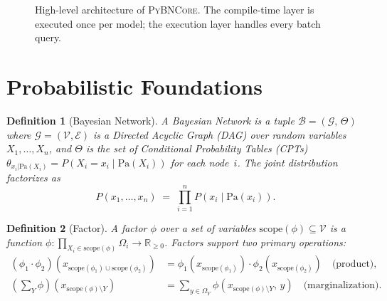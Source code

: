 \documentclass[11pt, letterpaper]{article}
\newcommand{\bncore}{\textsc{PyBNCore}}
\newcommand{\R}{\mathbb{R}}
\newcommand{\Pa}{\mathrm{Pa}}
\newcommand{\scope}{\mathrm{scope}}
\newcommand{\marg}[2]{\sum_{#1}{#2}}
\theoremstyle{definitionstyle}
\newtheorem{definition}{Definition}
\begin{document}
\begin{figure}[ht]
\caption{High-level architecture of \bncore{}. The compile-time layer is
executed once per model; the execution layer handles every batch query.}
\label{fig:architecture}
\end{figure}


\section{Probabilistic Foundations}
\label{sec:foundations}

\begin{definition}[Bayesian Network]
A Bayesian Network is a tuple $\mathcal{B} = (\mathcal{G},\, \Theta)$
where $\mathcal{G} = (\mathcal{V}, \mathcal{E})$ is a Directed Acyclic
Graph (DAG) over random variables $X_1, \ldots, X_n$, and $\Theta$
is the set of Conditional Probability Tables (CPTs)
$\theta_{x_i|\Pa(X_i)}=P(X_i{=}x_i\mid \Pa(X_i))$ for each node~$i$.
The joint distribution factorizes as
\[
  P(x_1,\ldots,x_n) \;=\; \prod_{i=1}^{n} P\!\left(x_i \mid \Pa(x_i)\right).
\]
\end{definition}

\begin{definition}[Factor]
A \emph{factor} $\phi$ over a set of variables $\scope(\phi) \subseteq \mathcal{V}$
is a function $\phi:\prod_{X_i\in\scope(\phi)} \Omega_i \to \R_{\geq 0}$.
Factors support two primary operations:
\begin{align}
  (\phi_1 \cdot \phi_2)(x_{\scope(\phi_1)\cup\scope(\phi_2)})
    &= \phi_1(x_{\scope(\phi_1)}) \cdot \phi_2(x_{\scope(\phi_2)})
    \quad\text{(product)},\\
  (\marg{Y}{\phi})(x_{\scope(\phi)\setminus Y})
    &= \sum_{y\in\Omega_Y} \phi(x_{\scope(\phi)\setminus Y},\, y)
    \quad\text{(marginalization)}.
\end{align}
\end{definition}
\end{document}
